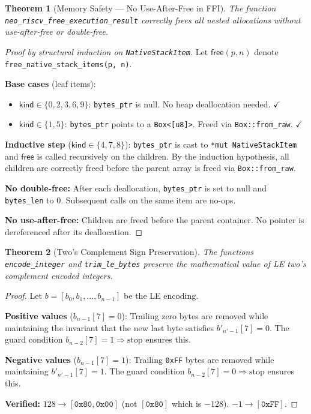 \documentclass[11pt,a4paper]{article}
\newtheorem{theorem}{Theorem}[section]
\begin{document}
\begin{theorem}[Memory Safety --- No Use-After-Free in FFI]
\label{thm:memory}
The function \texttt{neo\_riscv\_free\_execution\_result} correctly frees all nested allocations without use-after-free or double-free.
\end{theorem}

\begin{proof}[Proof by structural induction on \texttt{NativeStackItem}]
Let $\mathsf{free}(p, n)$ denote \texttt{free\_native\_stack\_items(p, n)}.

\textbf{Base cases} (leaf items):
\begin{itemize}
\item $\mathsf{kind} \in \{0, 2, 3, 6, 9\}$: \texttt{bytes\_ptr} is null. No heap deallocation needed. $\checkmark$
\item $\mathsf{kind} \in \{1, 5\}$: \texttt{bytes\_ptr} points to a \texttt{Box<[u8]>}. Freed via \texttt{Box::from\_raw}. $\checkmark$
\end{itemize}

\textbf{Inductive step} ($\mathsf{kind} \in \{4, 7, 8\}$):
\texttt{bytes\_ptr} is cast to \texttt{*mut NativeStackItem} and $\mathsf{free}$ is called recursively on the children. By the induction hypothesis, all children are correctly freed before the parent array is freed via \texttt{Box::from\_raw}.

\textbf{No double-free:} After each deallocation, \texttt{bytes\_ptr} is set to null and \texttt{bytes\_len} to 0. Subsequent calls on the same item are no-ops.

\textbf{No use-after-free:} Children are freed before the parent container. No pointer is dereferenced after its deallocation.
\end{proof}

\begin{theorem}[Two's Complement Sign Preservation]
\label{thm:sign}
The functions \texttt{encode\_integer} and \texttt{trim\_le\_bytes} preserve the mathematical value of LE two's complement encoded integers.
\end{theorem}

\begin{proof}
Let $b = [b_0, b_1, \ldots, b_{n-1}]$ be the LE encoding.

\textbf{Positive values} ($b_{n-1}[7] = 0$): Trailing zero bytes are removed while maintaining the invariant that the new last byte satisfies $b'_{n'-1}[7] = 0$. The guard condition $b_{n-2}[7] = 1 \Rightarrow \text{stop}$ ensures this.

\textbf{Negative values} ($b_{n-1}[7] = 1$): Trailing \texttt{0xFF} bytes are removed while maintaining $b'_{n'-1}[7] = 1$. The guard condition $b_{n-2}[7] = 0 \Rightarrow \text{stop}$ ensures this.

\textbf{Verified:} $128 \to [\texttt{0x80}, \texttt{0x00}]$ (not $[\texttt{0x80}]$ which is $-128$). $-1 \to [\texttt{0xFF}]$.
\end{proof}
\end{document}
